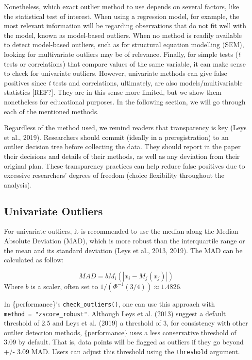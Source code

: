 \documentclass[
]{article}
\begin{document}
Nonetheless, which exact outlier method to use depends on several factors, like the statistical test of interest. When using a regression model, for example, the most relevant information will be regarding observations that do not fit well with the model, known as model-based outliers. When no method is readily available to detect model-based outliers, such as for structural equation modelling (SEM), looking for multivariate outliers may be of relevance. Finally, for simple tests (\emph{t} tests or correlations) that compare values of the same variable, it can make sense to check for univariate outliers. However, univariate methods can give false positives since \emph{t} tests and correlations, ultimately, are also models/multivariable statistics {[}REF?{]}. They are in this sense more limited, but we show them nonetheless for educational purposes. In the following section, we will go through each of the mentioned methods.

Regardless of the method used, we remind readers that transparency is key (Leys et al., 2019). Researchers should commit (ideally in a preregistration) to an outlier decision tree before collecting the data. They should report in the paper their decisions and details of their methods, as well as any deviation from their original plan. These transparency practices can help reduce false positives due to excessive researchers' degrees of freedom (choice flexibility throughout the analysis).

\hypertarget{univariate-outliers}{%
\subsection{Univariate Outliers}\label{univariate-outliers}}

For univariate outliers, it is recommended to use the median along the Median Absolute Deviation (MAD), which is more robust than the interquartile range or the mean and its standard deviation (Leys et al., 2013, 2019). The MAD can be calculated as follow:

\[
MAD = b M_i(|x_i-M_j(x_j)|)
\]
Where \(b\) is a scaler, often set to \(1/\left(\Phi ^{-1}(3/4)\right)\approx 1.4826\).

In \{performance\}'s \texttt{check\_outliers()}, one can use this approach with \texttt{method\ =\ "zscore\_robust"}. Although Leys et al. (2013) suggest a default threshold of 2.5 and Leys et al. (2019) a threshold of 3, for consistency with other outlier detection methods, \{performance\} uses a less conservative threshold of 3.09 by default. That is, data points will be flagged as outliers if they go beyond +/- 3.09 MAD. Users can adjust this threshold using the \texttt{threshold} argument.
\end{document}
